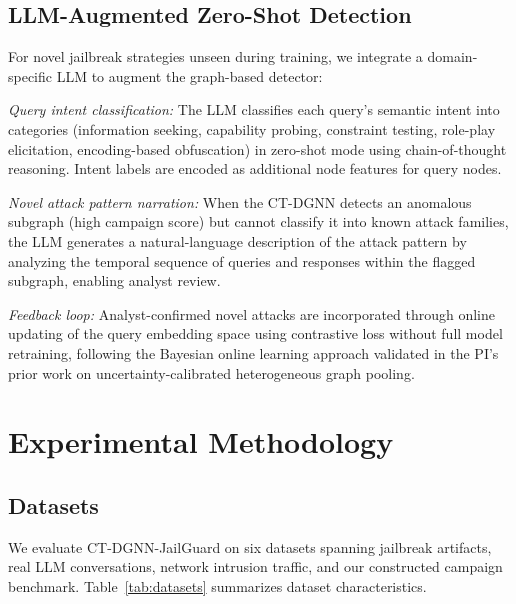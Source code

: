 \documentclass[journal]{IEEEtran}
\theoremstyle{plain}
\theoremstyle{definition}
\theoremstyle{remark}
\begin{document}
\subsection{LLM-Augmented Zero-Shot Detection}

For novel jailbreak strategies unseen during training, we integrate a domain-specific LLM to augment the graph-based detector:

\textit{Query intent classification:} The LLM classifies each query's semantic intent into categories (information seeking, capability probing, constraint testing, role-play elicitation, encoding-based obfuscation) in zero-shot mode using chain-of-thought reasoning. Intent labels are encoded as additional node features for query nodes.

\textit{Novel attack pattern narration:} When the CT-DGNN detects an anomalous subgraph (high campaign score) but cannot classify it into known attack families, the LLM generates a natural-language description of the attack pattern by analyzing the temporal sequence of queries and responses within the flagged subgraph, enabling analyst review.

\textit{Feedback loop:} Analyst-confirmed novel attacks are incorporated through online updating of the query embedding space using contrastive loss without full model retraining, following the Bayesian online learning approach validated in the PI's prior work on uncertainty-calibrated heterogeneous graph pooling.

\section{Experimental Methodology}
\label{sec:experiments}

\subsection{Datasets}

We evaluate CT-DGNN-JailGuard on six datasets spanning jailbreak artifacts, real LLM conversations, network intrusion traffic, and our constructed campaign benchmark. Table~\ref{tab:datasets} summarizes dataset characteristics.
\end{document}
